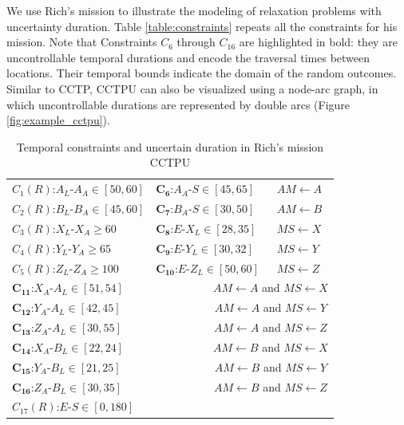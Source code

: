 \documentclass[jair,twoside,11pt,theapa]{article}
\begin{document}
We use Rich's mission to illustrate the modeling of relaxation problems
with uncertainty duration. Table \ref{table:constraints} repeats all the
constraints for his mission. Note that Constraints $C_6$ through $C_{16}$ are
highlighted in bold: they are uncontrollable temporal durations and encode the
traversal times between locations. Their temporal bounds indicate the domain of
the random outcomes. Similar to CCTP, CCTPU can also be visualized using a
node-arc graph, in which uncontrollable durations are represented by double arcs
(Figure \ref{fig:example_cctpu}).

\begin{table}[ht!]	
	\centering
	\begin{tabular}{| m{3.0cm} m{3.0cm} m{3.0cm} m{3.0cm} m{2.0cm}|}
		
		\hline		
		\multicolumn{2}{|l}{$C_1(R)$:$A_L$-$A_A\in [50,60]$} &
		\multicolumn{2}{l}{$\mathbf{C_6}$:$A_A$-$S\in[45,65]$} & $AM \leftarrow A$
		\\ 
		\multicolumn{2}{|l}{$C_2(R)$:$B_L$-$B_A\in [45,60]$} &
		\multicolumn{2}{l}{$\mathbf{C_7}$:$B_A$-$S\in[30,50]$} & $AM \leftarrow B$
		\\ 
		\multicolumn{2}{|l}{$C_3(R)$:$X_L$-$X_A\geq60$} &
		\multicolumn{2}{l}{$\mathbf{C_8}$:$E$-$X_L\in[28,35]$} & $MS \leftarrow X$
		\\ 
		\multicolumn{2}{|l}{$C_4(R)$:$Y_L$-$Y_A\geq65$} &
		\multicolumn{2}{l}{$\mathbf{C_9}$:$E$-$Y_L\in[30,32]$} & $MS \leftarrow Y$
		\\ 
		\multicolumn{2}{|l}{$C_5(R)$:$Z_L$-$Z_A\geq100$} &
		\multicolumn{2}{l}{$\mathbf{C_{10}}$:$E$-$Z_L\in[50,60]$} & $MS \leftarrow
		Z$ \\ 
		\hline
		\multicolumn{3}{|l}{$\mathbf{C_{11}}$:$X_A$-$A_L\in[51,54]$} &
		\multicolumn{2}{c|}{$AM
			\leftarrow A$ and $MS \leftarrow X$} \\ 
		\multicolumn{3}{|l}{$\mathbf{C_{12}}$:$Y_A$-$A_L\in[42,45]$} &
		\multicolumn{2}{c|}{$AM
			\leftarrow A$ and $MS \leftarrow Y$} \\ 
		\multicolumn{3}{|l}{$\mathbf{C_{13}}$:$Z_A$-$A_L\in[30,55]$} &
		\multicolumn{2}{c|}{$AM
			\leftarrow A$ and $MS \leftarrow Z$} \\ 
		\multicolumn{3}{|l}{$\mathbf{C_{14}}$:$X_A$-$B_L\in[22,24]$} &
		\multicolumn{2}{c|}{$AM
			\leftarrow B$ and $MS \leftarrow X$} \\ 
		\multicolumn{3}{|l}{$\mathbf{C_{15}}$:$Y_A$-$B_L\in[21,25]$} &
		\multicolumn{2}{c|}{$AM
			\leftarrow B$ and $MS \leftarrow Y$} \\ 
		\multicolumn{3}{|l}{$\mathbf{C_{16}}$:$Z_A$-$B_L\in[30,35]$} &
		\multicolumn{2}{c|}{$AM
			\leftarrow B$ and $MS \leftarrow Z$} \\ \hline
		\multicolumn{5}{|l|}{$C_{17}(R)$:$E$-$S\in[0,180]$}
		\\
		\hline
	\end{tabular}
	\caption{Temporal constraints and uncertain duration in Rich's mission CCTPU}
	\label{table:stnu_constraints}
\end{table}
\end{document}
